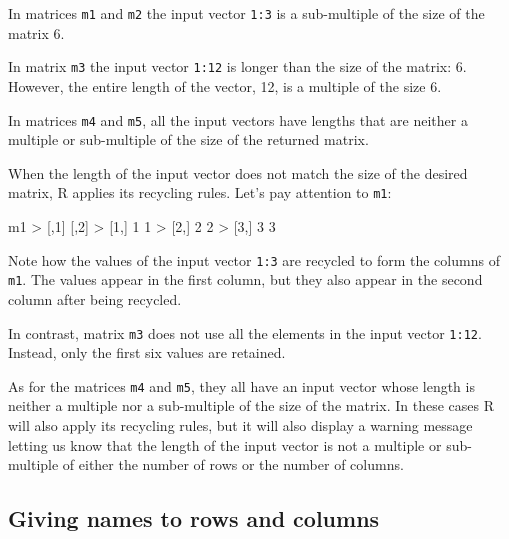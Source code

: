 \documentclass[
]{book}
\newenvironment{Shaded}{\begin{snugshade}}{\end{snugshade}}
\newcommand{\DecValTok}[1]{\textcolor[rgb]{0.00,0.00,0.81}{#1}}
\newcommand{\NormalTok}[1]{#1}
\newcommand{\SpecialCharTok}[1]{\textcolor[rgb]{0.00,0.00,0.00}{#1}}
\begin{document}
In matrices \texttt{m1} and \texttt{m2} the input vector \texttt{1:3} is a sub-multiple of the size
of the matrix 6.

In matrix \texttt{m3} the input vector \texttt{1:12} is longer than the size of the matrix: 6.
However, the entire length of the vector, 12, is a multiple of the size 6.

In matrices \texttt{m4} and \texttt{m5}, all the input vectors have lengths that are
neither a multiple or sub-multiple of the size of the returned matrix.

When the length of the input vector does not match the size of the desired
matrix, R applies its recycling rules. Let's pay attention to \texttt{m1}:

\begin{Shaded}
\begin{Highlighting}[]
\NormalTok{m1}
\SpecialCharTok{\textgreater{}}\NormalTok{      [,}\DecValTok{1}\NormalTok{] [,}\DecValTok{2}\NormalTok{]}
\SpecialCharTok{\textgreater{}}\NormalTok{ [}\DecValTok{1}\NormalTok{,]    }\DecValTok{1}    \DecValTok{1}
\SpecialCharTok{\textgreater{}}\NormalTok{ [}\DecValTok{2}\NormalTok{,]    }\DecValTok{2}    \DecValTok{2}
\SpecialCharTok{\textgreater{}}\NormalTok{ [}\DecValTok{3}\NormalTok{,]    }\DecValTok{3}    \DecValTok{3}
\end{Highlighting}
\end{Shaded}

Note how the values of the input vector \texttt{1:3} are recycled to form the columns
of \texttt{m1}. The values appear in the first column, but they also appear in the
second column after being recycled.

In contrast, matrix \texttt{m3} does not use all the elements in the input vector
\texttt{1:12}. Instead, only the first six values are retained.

As for the matrices \texttt{m4} and \texttt{m5}, they all have an input vector whose
length is neither a multiple nor a sub-multiple of the size of the matrix.
In these cases R will also apply its recycling rules, but it will also display
a warning message letting us know that the length of the input vector is not a
multiple or sub-multiple of either the number of rows or the number of columns.

\hypertarget{giving-names-to-rows-and-columns}{%
\subsection{Giving names to rows and columns}\label{giving-names-to-rows-and-columns}}
\end{document}
